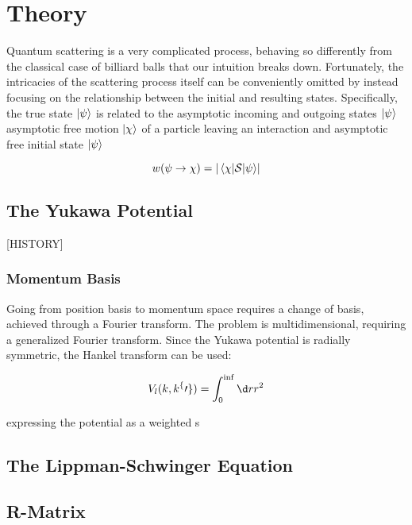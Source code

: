 \documentclass[12pt, a4paper, abstracton]{scrartcl}
\begin{document}
\section{Theory}\label{sec:Theory}

\newcommand{\pin}{\psi_\text{in}}
\newcommand{\pout}{\psi_\text{out}}
Quantum scattering is a very complicated process, behaving so differently from the
classical case of billiard balls that our intuition breaks down. Fortunately, the intricacies of
the scattering process itself can be conveniently omitted by instead focusing on
the relationship between the initial and resulting states.
Specifically, the true state \(\ket{\psi}\) is related to the asymptotic
incoming and outgoing states \(\ket{\psi_{}}\)
asymptotic free motion \(\ket{\chi}\) of a particle leaving an interaction and 
asymptotic free initial state \(\ket{\psi}\) 

\begin{equation*}
 w(\psi \to \chi) = \left| \mel{\chi}{\mathcal{S}}{\psi} \right|
\end{equation*}

\subsection{The Yukawa Potential}
[HISTORY]

\subsubsection{Momentum Basis}

Going from position basis to momentum space requires a change of basis, achieved
through a Fourier transform. The problem is multidimensional, requiring a
generalized Fourier transform. Since the Yukawa potential is radially 
symmetric, the Hankel transform can be used:

\newcommand{\kp}{k^\{\prime\}}
\begin{equation*}
  V_{l}(k, \kp) = \int_{0}^{\inf} \d r r^{2}
\end{equation*}

expressing the potential as a
weighted s

\subsection{The Lippman-Schwinger Equation}


\subsection{R-Matrix}\label{sec:Rmatrix}






\end{document}
